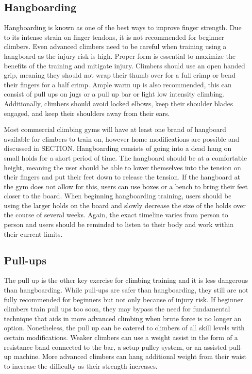 \documentclass[10pt,twocolumn]{article}
\begin{document}
\subsection{Hangboarding}

	Hangboarding is known as one of the best ways to improve finger strength. Due to its intense strain on finger tendons, it is not recommended for beginner climbers. Even advanced climbers need to be careful when training using a hangboard as the injury risk is high. Proper form is essential to maximize the benefits of the training and mitigate injury. Climbers should use an open handed grip, meaning they should not wrap their thumb over for a full crimp or bend their fingers for a half crimp. Ample warm up is also recommended, this can consist of pull ups on jugs or a pull up bar or light low intensity climbing. Additionally, climbers should avoid locked elbows, keep their shoulder blades engaged, and keep their shoulders away from their ears. \cite{rei_how_nodate}

    Most commercial climbing gyms will have at least one brand of hangboard available for climbers to train on, however home modifications are possible and discussed in SECTION. Hangboarding consists of going into a dead hang on small holds for a short period of time. The hangboard should be at a comfortable height, meaning the user should be able to lower themselves into the tension on their fingers and put their feet down to release the tension. If the hangboard at the gym does not allow for this, users can use boxes or a bench to bring their feet closer to the board. When beginning hangboarding training, users should be using the larger holds on the board and slowly decrease the size of the holds over the course of several weeks. Again, the exact timeline varies from person to person and users should be reminded to listen to their body and work within their current limits. \cite{sheldon_how_2022} 

\subsection{Pull-ups}
    The pull up is the other key exercise for climbing training and it is less dangerous than hangboarding. While pull-ups are safer than hangboarding, they still are not fully recommended for beginners but not only because of injury risk. If beginner climbers train pull ups too soon, they may bypass the need for fundamental technique that aids in more advanced climbing when brute force is no longer an option. \cite{gripped_pull-ups_2021} Nonetheless, the pull up can be catered to climbers of all skill levels with certain modifications. Weaker climbers can use a weight assist in the form of a resistance band connected to the bar, a setup pulley system, or an assisted pull-up machine. More advanced climbers can hang additional weight from their waist to increase the difficulty as their strength increases. \cite{sheldon_how_2022} 
\end{document}

